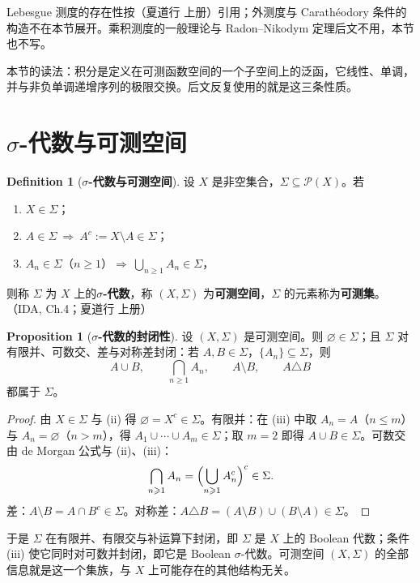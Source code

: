 \documentclass[oneside]{book}
\theoremstyle{definition}
\theoremstyle{definition}
\newtheorem{proposition}{Proposition}[section]
\newtheorem{definition}{Definition}[section]
\begin{document}
	Lebesgue 测度的存在性按（夏道行 上册）引用；外测度与 Carathéodory 条件的构造不在本节展开。乘积测度的一般理论与 Radon--Nikodym 定理后文不用，本节也不写。
	
	本节的读法：积分是定义在可测函数空间的一个子空间上的泛函，它线性、单调，并与非负单调递增序列的极限交换。后文反复使用的就是这三条性质。
	
	\section{$\sigma$-代数与可测空间}
	
	\begin{definition}[\bfseries{$\sigma$-代数与可测空间}]
		设 $X$ 是非空集合，$\Sigma\subseteq\mathcal{P}(X)$。若
		\begin{enumerate}
			\item $X\in\Sigma$；
			\item $A\in\Sigma\ \Rightarrow\ A^{c}:=X\setminus A\in\Sigma$；
			\item $A_n\in\Sigma$（$n\geqslant1$）$\Rightarrow\ \bigcup_{n\geqslant1}A_n\in\Sigma$，
		\end{enumerate}
		则称 $\Sigma$ 为 $X$ 上的\textbf{$\sigma$-代数}，称 $(X,\Sigma)$ 为\textbf{可测空间}，$\Sigma$ 的元素称为\textbf{可测集}。（IDA, Ch.4；夏道行 上册）
	\end{definition}
	
	\begin{proposition}[\bfseries{$\sigma$-代数的封闭性}]
		设 $(X,\Sigma)$ 是可测空间。则 $\varnothing\in\Sigma$；且 $\Sigma$ 对有限并、可数交、差与对称差封闭：若 $A,B\in\Sigma$，$\{A_n\}\subseteq\Sigma$，则
		\[
		A\cup B,\qquad \bigcap_{n\geqslant1}A_n,\qquad A\setminus B,\qquad A\triangle B
		\]
		都属于 $\Sigma$。
	\end{proposition}
	
	\begin{proof}
		由 $X\in\Sigma$ 与 (ii) 得 $\varnothing=X^{c}\in\Sigma$。有限并：在 (iii) 中取 $A_n=A$（$n\leqslant m$）与 $A_n=\varnothing$（$n>m$），得 $A_1\cup\cdots\cup A_m\in\Sigma$；取 $m=2$ 即得 $A\cup B\in\Sigma$。可数交由 de Morgan 公式与 (ii)、(iii)：
		\[
		\bigcap_{n\geqslant1}A_n=\Bigl(\bigcup_{n\geqslant1}A_n^{c}\Bigr)^{c}\in\Sigma .
		\]
		差：$A\setminus B=A\cap B^{c}\in\Sigma$。对称差：$A\triangle B=(A\setminus B)\cup(B\setminus A)\in\Sigma$。
	\end{proof}
	
	于是 $\Sigma$ 在有限并、有限交与补运算下封闭，即 $\Sigma$ 是 $X$ 上的 Boolean 代数；条件 (iii) 使它同时对可数并封闭，即它是 Boolean $\sigma$-代数。可测空间 $(X,\Sigma)$ 的全部信息就是这一个集族，与 $X$ 上可能存在的其他结构无关。
	
\end{document}
